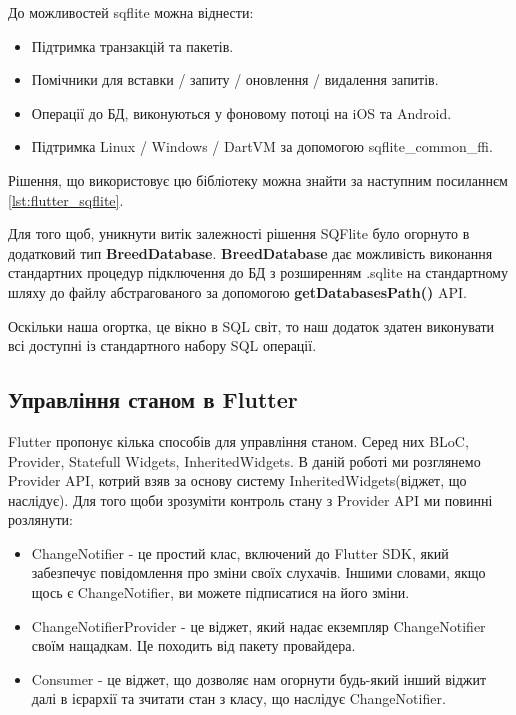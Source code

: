 До можливостей sqflite можна віднести:

\begin{itemize}
    \item Підтримка транзакцій та пакетів.
    \item Помічники для вставки / запиту / оновлення / видалення запитів.
    \item Операції до БД, виконуються у фоновому потоці на iOS та Android.
    \item Підтримка Linux / Windows / DartVM за допомогою sqflite_common_ffi.
\end{itemize}

Рішення, що використовує цю бібліотеку можна знайти за наступним посиланнєм \ref{lst:flutter_sqflite}.

Для того щоб, уникнути витік залежності рішення SQFlite було огорнуто в додатковий тип \textbf{BreedDatabase}.
\textbf{BreedDatabase} дає можливість виконання стандартних процедур підключення до БД з розширенням .sqlite
на стандартному шляху до файлу абстрагованого за допомогою \textbf{getDatabasesPath()} API.

Оскільки наша огортка, це вікно в SQL світ, то наш додаток здатен виконувати всі доступні із стандартного набору
SQL операції.

\subsection{Управління станом в Flutter}
\label{subsec:flutter_state_app}
Flutter пропонує кілька способів для управління станом. Серед них BLoC, Provider, Statefull Widgets, InheritedWidgets.
В даній роботі ми розглянемо Provider API, котрий взяв за основу систему InheritedWidgets(віджет, що наслідує).
Для того щоби зрозуміти контроль стану з Provider API ми повинні розлянути:

\begin{itemize}
    \item ChangeNotifier - це простий клас, включений до Flutter SDK, який забезпечує повідомлення про зміни своїх слухачів. Іншими словами, якщо щось є ChangeNotifier, ви можете підписатися на його зміни.
    \item ChangeNotifierProvider - це віджет, який надає екземпляр ChangeNotifier своїм нащадкам. Це походить від пакету провайдера.
    \item Consumer - це віджет, що дозволяє нам огорнути будь-який інший віджит далі в ієрархії та зчитати стан з класу, що наслідує ChangeNotifier.
\end{itemize}

